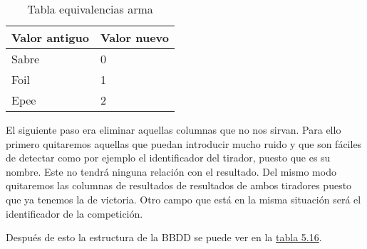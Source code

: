 \begin{table}[]
  \centering
  \caption{Tabla equivalencias arma}
  \label{tab:Tabla equivalencias arma}
  \begin{tabular}{|ll|}
    \hline
    \rowcolor[HTML]{C0C0C0}
    Valor antiguo & Valor nuevo \\ \hline
    Sabre & 0 \\ \hline
    Foil & 1 \\ \hline
    Epee & 2 \\ \hline
  \end{tabular}
\end{table}

El siguiente paso era eliminar aquellas columnas que no nos sirvan. Para ello
primero quitaremos aquellas que puedan introducir mucho ruido y que son fáciles
de detectar como por ejemplo el identificador del tirador, puesto que es su nombre.
Este no tendrá ninguna relación con el resultado. Del mismo modo quitaremos las columnas
de resultados de resultados de ambos tiradores puesto que ya tenemos la de victoria.
Otro campo que está en la misma situación será el identificador de la competición.

Después de esto la estructura de la \acs {BBDD} se puede ver en la \hyperref[tab:Estructura BBDD final postproceso]{tabla 5.16}.


